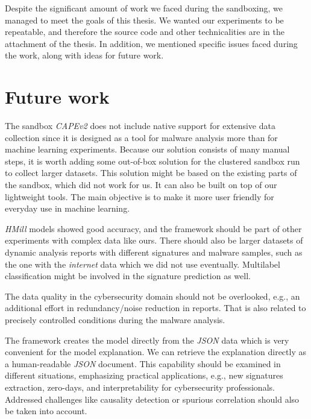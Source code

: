 Despite the significant amount of work we faced during the sandboxing, we managed to meet the goals of this thesis. We wanted our experiments to be repeatable, and therefore the source code and other technicalities are in the attachment of the thesis. In addition, we mentioned specific issues faced during the work, along with ideas for future work.

\section*{Future work}
The sandbox \emph{CAPEv2} does not include native support for extensive data collection since it is designed as a tool for malware analysis more than for machine learning experiments. Because our solution consists of many manual steps, it is worth adding some out-of-box solution for the clustered sandbox run to collect larger datasets. This solution might be based on the existing parts of the sandbox, which did not work for us. It can also be built on top of our lightweight tools. The main objective is to make it more user friendly for everyday use in machine learning.

\emph{HMill} models showed good accuracy, and the framework should be part of other experiments with complex data like ours. There should also be larger datasets of dynamic analysis reports with different signatures and malware samples, such as the one with the \emph{internet} data which we did not use eventually. Multilabel classification might be involved in the signature prediction as well. 

The data quality in the cybersecurity domain should not be overlooked, e.g., an additional effort in redundancy/noise reduction in reports. That is also related to precisely controlled conditions during the malware analysis.

The framework creates the model directly from the \emph{JSON} data which is very convenient for the model explanation. We can retrieve the explanation directly as a human-readable \emph{JSON} document. This capability should be examined in different situations, emphasizing practical applications, e.g., new signatures extraction, zero-days, and interpretability for cybersecurity professionals. Addressed challenges like causality detection or spurious correlation should also be taken into account.